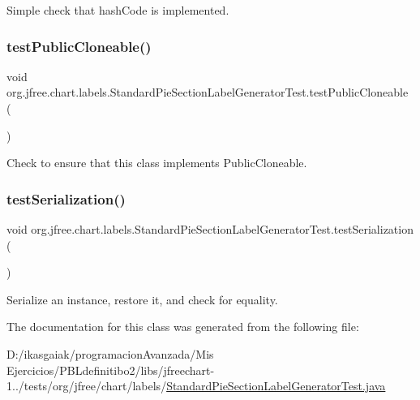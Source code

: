 Simple check that hash\+Code is implemented. \mbox{\label{classorg_1_1jfree_1_1chart_1_1labels_1_1_standard_pie_section_label_generator_test_a044513f3efa62ce392c1390d2a042636}} 
\subsubsection{\texorpdfstring{test\+Public\+Cloneable()}{testPublicCloneable()}}
{\footnotesize\ttfamily void org.\+jfree.\+chart.\+labels.\+Standard\+Pie\+Section\+Label\+Generator\+Test.\+test\+Public\+Cloneable (\begin{DoxyParamCaption}{ }\end{DoxyParamCaption})}

Check to ensure that this class implements Public\+Cloneable. \mbox{\label{classorg_1_1jfree_1_1chart_1_1labels_1_1_standard_pie_section_label_generator_test_af3702523300a89e263e4f065dc5a2246}} 
\subsubsection{\texorpdfstring{test\+Serialization()}{testSerialization()}}
{\footnotesize\ttfamily void org.\+jfree.\+chart.\+labels.\+Standard\+Pie\+Section\+Label\+Generator\+Test.\+test\+Serialization (\begin{DoxyParamCaption}{ }\end{DoxyParamCaption})}

Serialize an instance, restore it, and check for equality. 

The documentation for this class was generated from the following file\+:\begin{DoxyCompactItemize}
\item 
D\+:/ikasgaiak/programacion\+Avanzada/\+Mis Ejercicios/\+P\+B\+Ldefinitibo2/libs/jfreechart-\/1../tests/org/jfree/chart/labels/\mbox{\hyperlink{_standard_pie_section_label_generator_test_8java}{Standard\+Pie\+Section\+Label\+Generator\+Test.\+java}}\end{DoxyCompactItemize}
